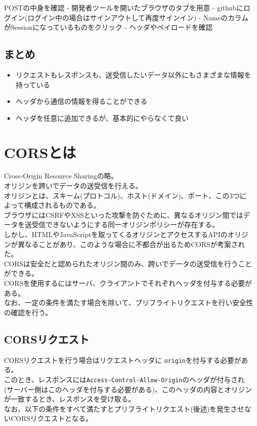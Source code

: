 POSTの中身を確認 - 開発者ツールを開いたブラウザのタブを用意 -
githubにログイン(ログイン中の場合はサインアウトして再度サインイン) -
NameのカラムがSessionになっているものをクリック -
ヘッダやペイロードを確認

\subsection{まとめ}\label{ux307eux3068ux3081-1}

\begin{itemize}
\tightlist
\item
  リクエストもレスポンスも、送受信したいデータ以外にもさまざまな情報を持っている
\item
  ヘッダから通信の情報を得ることができる
\item
  ヘッダを任意に追加できるが、基本的にやらなくて良い
\end{itemize}

\section{CORSとは}\label{corsux3068ux306f}

Cross-Origin Resource Sharingの略。\\
オリジンを跨いでデータの送受信を行える。\\
オリジンとは、スキーム(プロトコル)、ホスト(ドメイン)、ポート、この3つによって構成されるものである。\\
ブラウザにはCSRFやXSSといった攻撃を防ぐために、異なるオリジン間ではデータを送受信できないようにする同一オリジンポリシーが存在する。\\
しかし、HTMLやJavaScriptを取ってくるオリジンとアクセスするAPIのオリジンが異なることがあり、このような場合に不都合が出るためCORSが考案された。\\
CORSは安全だと認められたオリジン間のみ、跨いでデータの送受信を行うことができる。\\
CORSを使用するにはサーバ、クライアントでそれぞれヘッダを付与する必要がある。\\
なお、一定の条件を満たす場合を除いて、プリフライトリクエストを行い安全性の確認を行う。

\subsection{CORSリクエスト}\label{corsux30eaux30afux30a8ux30b9ux30c8}

CORSリクエストを行う場合はリクエストヘッダに
\texttt{origin}を付与する必要がある。\\
このとき、レスポンスには\texttt{Access-Control-Allow-Origin}のヘッダが付与され(サーバー側はこのヘッダを付与する必要がある)、このヘッダの内容とオリジンが一致するとき、レスポンスを受け取る。\\
なお、以下の条件をすべて満たすとプリフライトリクエスト(後述)を発生させないCORSリクエストとなる。

